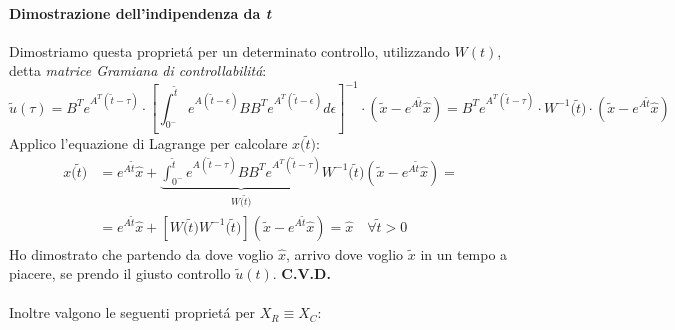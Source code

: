 \documentclass[../main.tex]{subfiles}
\begin{document}
			\paragraph{Dimostrazione dell'indipendenza da \textit{t}}
			Dimostriamo questa propriet\'a per un determinato controllo, utilizzando $W(t)$, detta \textit{matrice Gramiana di controllabilit\'a}:
			\[
				\tilde u(\tau) = B^T e^{A^T (\tilde t - \tau)} \cdot \left[ \int_{0^-}^{\tilde t} e^{A(\tilde t - \epsilon)} B B^T e^{A^T (\tilde t - \epsilon)} d\epsilon \right]^{-1} \cdot \left( \tilde x - e^{A \tilde t} \hat x \right) = B^T e^{A^T (\tilde t - \tau)} \cdot W^{-1}\big( \tilde t \big) \cdot \left( \tilde x - e^{A \tilde t} \hat x \right)
			\]
			Applico l'equazione di Lagrange per calcolare $ x\big( \tilde t \big) $:
			\begin{align*}
				x\big( \tilde t \big) &= e^{A \tilde t} \hat x + \underbrace{\int_{0^-}^{\tilde t} e^{A(\tilde t - \tau)} B B^T e^{A^T (\tilde t - \tau)}}_{W\big( \tilde t \big)} W^{-1}\big( \tilde t \big) \left( \tilde x - e^{A \tilde t} \hat x \right) =
				\\
				&= e^ {A \tilde t} \hat x + \left[ W\big( \tilde t \big) W^{-1}\big( \tilde t \big) \right] \left( \tilde x - e^{A \tilde t} \hat x \right) = \hat x \quad \forall \tilde t > 0
			\end{align*}
			Ho dimostrato che partendo da dove voglio $ \hat x $, arrivo dove voglio $ \tilde x $ in un tempo a piacere, se prendo il giusto controllo $ \tilde u(t) $. \textbf{C.V.D.} \\
		\\
		\noindent
		Inoltre valgono le seguenti propriet\'a per $ X_R \equiv X_C $:
\end{document}
